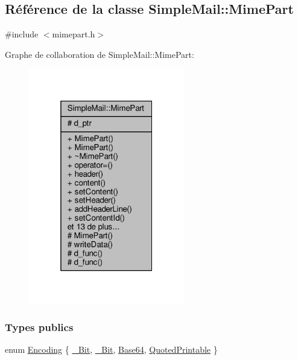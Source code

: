 \hypertarget{class_simple_mail_1_1_mime_part}{}\subsection{Référence de la classe Simple\+Mail\+:\+:Mime\+Part}
\label{class_simple_mail_1_1_mime_part}


{\ttfamily \#include $<$mimepart.\+h$>$}



Graphe de collaboration de Simple\+Mail\+:\+:Mime\+Part\+:\nopagebreak
\begin{figure}[H]
\begin{center}
\leavevmode
\includegraphics[width=193pt]{class_simple_mail_1_1_mime_part__coll__graph}
\end{center}
\end{figure}
\subsubsection*{Types publics}
\begin{DoxyCompactItemize}
\item 
enum \hyperlink{class_simple_mail_1_1_mime_part_ae67a2f5406958b95b18bf31a7bbeb5c9}{Encoding} \{ \hyperlink{class_simple_mail_1_1_mime_part_ae67a2f5406958b95b18bf31a7bbeb5c9a93d518d86036ce6f149ffa646b52235a}{\+\_\+Bit}, 
\hyperlink{class_simple_mail_1_1_mime_part_ae67a2f5406958b95b18bf31a7bbeb5c9a27c1574a6fe2fa936ae6cfe9654bb37f}{\+\_\+Bit}, 
\hyperlink{class_simple_mail_1_1_mime_part_ae67a2f5406958b95b18bf31a7bbeb5c9ae644dc14ba856889814d2da9c995b91a}{Base64}, 
\hyperlink{class_simple_mail_1_1_mime_part_ae67a2f5406958b95b18bf31a7bbeb5c9a29b5533d69a04cfef2c3ff6538c44db0}{Quoted\+Printable}
 \}
\end{DoxyCompactItemize}
